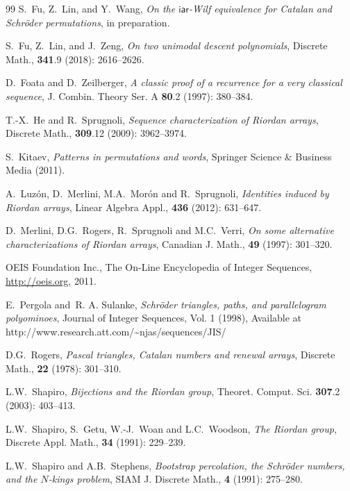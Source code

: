 \documentclass[11pt,reqno]{amsart}
\numberwithin{equation}{section}
\theoremstyle{plain}
\theoremstyle{definition}
\def\iar{\mathsf{iar}}
\begin{document}
\begin{thebibliography}{99}
 S.~Fu, Z.~Lin, and Y.~Wang, \textit{On the $\iar$-Wilf equivalence for Catalan and Schr\"oder permutations}, in preparation.

 S.~Fu, Z.~Lin, and J.~Zeng, \textit{On two unimodal descent polynomials}, Discrete Math., {\bf 341}.9 (2018): 2616--2626.

 D.~Foata and D.~Zeilberger, \textit{A classic proof of a recurrence for a very classical sequence}, J. Combin. Theory Ser. A {\bf 80}.2 (1997): 380--384.


 T.-X.~He and R.~Sprugnoli, \textit{Sequence characterization of Riordan arrays}, Discrete Math., {\bf 309}.12 (2009): 3962--3974.

S.~Kitaev, \emph{Patterns in permutations and words}, Springer Science \& Business Media (2011).

 A.~Luz\'on, D.~Merlini, M.A.~Mor\'on and R.~Sprugnoli, \textit{Identities induced by Riordan arrays}, Linear Algebra Appl., {\bf 436} (2012): 631--647.

 D.~Merlini, D.G.~Rogers, R.~Sprugnoli and M.C.~Verri, \textit{On some alternative characterizations of Riordan arrays}, Canadian J. Math., {\bf 49} (1997): 301--320.

 OEIS Foundation Inc., The On-Line Encyclopedia of Integer Sequences,  \href{http://oeis.org}{http://oeis.org}, 2011.

 E.~Pergola and~R. A. Sulanke, \textit{Schr\"oder triangles, paths, and parallelogram polyominoes}, Journal of Integer Sequences, Vol. 1 (1998), Available at http://www.research.att.com/\~{}njas/sequences/JIS/

 D.G.~Rogers, \textit{Pascal triangles, Catalan numbers and renewal arrays}, Discrete Math., {\bf 22} (1978): 301--310.

 L.W.~Shapiro, \textit{Bijections and the Riordan group}, Theoret. Comput. Sci. {\bf 307}.2 (2003): 403--413.

 L.W.~Shapiro, S.~Getu, W.-J.~Woan and L.C.~Woodson, \textit{The Riordan group}, Discrete Appl. Math., {\bf 34} (1991): 229--239.

 L.W.~Shapiro and A.B.~Stephens, \textit{Bootstrap percolation, the Schr\"oder numbers, and the $N$-kings problem}, SIAM J. Discrete Math., {\bf 4} (1991): 275--280.


\end{thebibliography}
\end{document}
